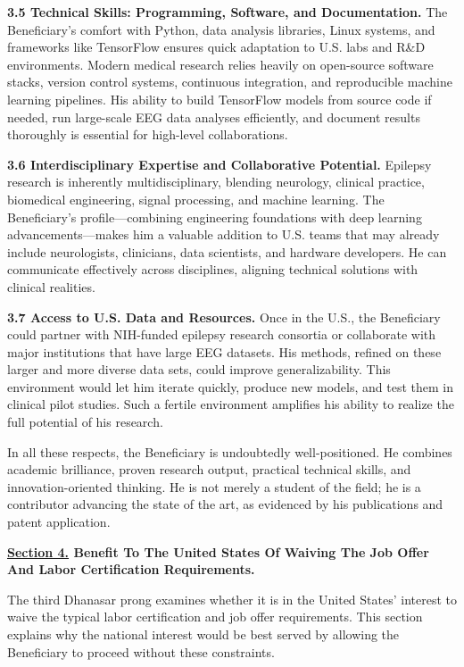 \documentclass{article}
\begin{document}
{\bf 3.5 Technical Skills: Programming, Software, and Documentation.}
The Beneficiary’s comfort with Python, data analysis libraries, Linux systems, and frameworks like TensorFlow ensures quick adaptation to U.S. labs and R\&D environments. Modern medical research relies heavily on open-source software stacks, version control systems, continuous integration, and reproducible machine learning pipelines. His ability to build TensorFlow models from source code if needed, run large-scale EEG data analyses efficiently, and document results thoroughly is essential for high-level collaborations.


{\bf 3.6 Interdisciplinary Expertise and Collaborative Potential.}
Epilepsy research is inherently multidisciplinary, blending neurology, clinical practice, biomedical engineering, signal processing, and machine learning. The Beneficiary’s profile—combining engineering foundations with deep learning advancements—makes him a valuable addition to U.S. teams that may already include neurologists, clinicians, data scientists, and hardware developers. He can communicate effectively across disciplines, aligning technical solutions with clinical realities.

{\bf 3.7 Access to U.S. Data and Resources.}
Once in the U.S., the Beneficiary could partner with NIH-funded epilepsy research consortia or collaborate with major institutions that have large EEG datasets. His methods, refined on these larger and more diverse data sets, could improve generalizability. This environment would let him iterate quickly, produce new models, and test them in clinical pilot studies. Such a fertile environment amplifies his ability to realize the full potential of his research.

In all these respects, the Beneficiary is undoubtedly well-positioned. He combines academic brilliance, proven research output, practical technical skills, and innovation-oriented thinking. He is not merely a student of the field; he is a contributor advancing the state of the art, as evidenced by his publications and patent application.


\clearpage

{\bf \underline{Section 4.} Benefit To The United States Of Waiving The Job Offer And Labor Certification Requirements. }

The third Dhanasar prong examines whether it is in the United States’ interest to waive the typical labor certification and job offer requirements. This section explains why the national interest would be best served by allowing the Beneficiary to proceed without these constraints.
\end{document}
